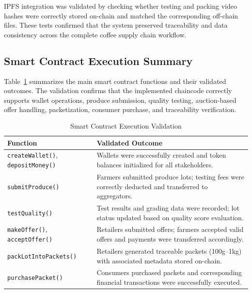 \documentclass[manuscript,screen]{acmart}
\begin{document}
IPFS integration was validated by checking whether testing and packing video hashes were correctly stored on-chain and matched the corresponding off-chain files. These tests confirmed that the system preserved traceability and data consistency across the complete coffee supply chain workflow.

\subsection{Smart Contract Execution Summary}

Table~\ref{tab:smartcontract-validation} summarizes the main smart contract functions and their validated outcomes. The validation confirms that the implemented chaincode correctly supports wallet operations, produce submission, quality testing, auction-based offer handling, packetization, consumer purchase, and traceability verification.
	
	\begin{table}[ht]
		\centering
		\caption{Smart Contract Execution Validation}
		\label{tab:smartcontract-validation}
		\renewcommand{\arraystretch}{1.3}
		\begin{tabular}{|p{4cm}|p{9cm}|}
			\hline
			\textbf{Function} & \textbf{Validated Outcome} \\
			\hline
			\texttt{createWallet()}, \texttt{depositMoney()}  & Wallets were successfully created and token balances initialized for all stakeholders. \\
			\hline
			\texttt{submitProduce()} & Farmers submitted produce lots; testing fees were correctly deducted and transferred to aggregators. \\
			\hline
			\texttt{testQuality()}  & Test results and grading data were recorded; lot status updated based on quality score evaluation. \\
			\hline
			\texttt{makeOffer()}, \texttt{acceptOffer()} & Retailers submitted offers; farmers accepted valid offers and payments were transferred accordingly. \\
			\hline
			\texttt{packLotIntoPackets()} & Retailers generated traceable packets (100g–1kg) with associated metadata stored on-chain. \\
			\hline
			\texttt{purchasePacket()} & Consumers purchased packets and corresponding financial transactions were successfully executed. \\
			\hline
		\end{tabular}
	\end{table}
	
\end{document}
